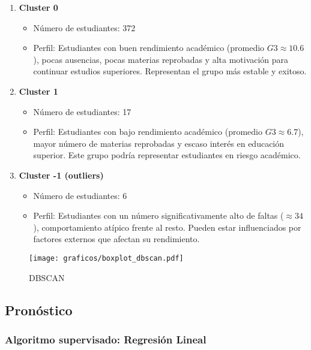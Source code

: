 \documentclass{article}
\begin{document}
\begin{enumerate}[label=(\alph*)]
    \item \textbf{Cluster 0}

    \begin{itemize}
        \item Número de estudiantes: 372
        \item Perfil: Estudiantes con buen rendimiento académico (promedio $G3 \approx 10.6$), pocas ausencias, pocas materias reprobadas y alta motivación para continuar estudios superiores. Representan el grupo más estable y exitoso.
    \end{itemize}
    
    \item \textbf{Cluster 1}

    \begin{itemize}
        \item Número de estudiantes: 17
        \item Perfil: Estudiantes con bajo rendimiento académico (promedio $G3 \approx 6.7$), mayor número de materias reprobadas y escaso interés en educación superior. Este grupo podría representar estudiantes en riesgo académico.
    \end{itemize}
    
    \item \textbf{Cluster -1 (outliers)}

    \begin{itemize}
        \item Número de estudiantes: 6
        \item Perfil: Estudiantes con un número significativamente alto de faltas ($\approx 34$), comportamiento atípico frente al resto. Pueden estar influenciados por factores externos que afectan su rendimiento.
    \end{itemize}
\end{enumerate}

\begin{figure}[H]
    \centering
    \texttt{[image: graficos/boxplot\_dbscan.pdf]}
    \caption{\small DBSCAN}
    \label{fig:boxplot_dbscan}
\end{figure}


\subsection*{Pronóstico}

\subsubsection*{Algoritmo supervisado: \textbf{Regresión Lineal}}
\end{document}
